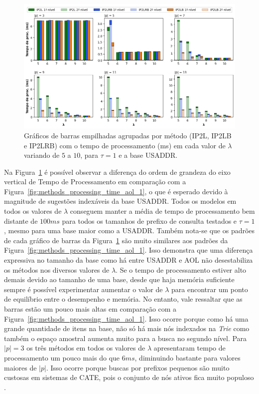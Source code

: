 \begin{figure} [h]
    \centering
    \includegraphics[width=1.0\textwidth]{figures/methods_processing_time_usaddr_1.png}
    \caption{Gráficos de barras empilhadas agrupadas por método (IP2L, IP2LB e IP2LRB) com o tempo de processamento (ms) em cada valor de $\lambda$ variando de $5$ a $10$, para $\tau=1$ e a base USADDR.}
    \label{fig:methods_processing_time_usaddr_1}
\end{figure}

Na Figura~\ref{fig:methods_processing_time_usaddr_1} é possível observar a diferença do ordem de grandeza do eixo vertical de Tempo de Processamento em comparação com a Figura~\ref{fig:methods_processing_time_aol_1}, o que é esperado devido à magnitude de sugestões indexáveis da base USADDR. Todos os modelos em todos os valores de $\lambda$ conseguem manter a média de tempo de processamento bem distante de $100ms$ para todos os tamanhos de prefixo de consulta testados e $\tau=1$, mesmo para uma base maior como a USADDR. Também nota-se que os padrões de cada gráfico de barras da Figura~\ref{fig:methods_processing_time_usaddr_1} são muito similares aos padrões da Figura~\ref{fig:methods_processing_time_aol_1}. Isso demonstra que uma diferença expressiva no tamanho da base como há entre USADDR e AOL não desestabiliza os métodos nos diversos valores de $\lambda$. Se o tempo de processamento estiver alto demais devido ao tamanho de uma base, desde que haja memória suficiente sempre é possível experimentar aumentar o valor de $\lambda$ para encontrar um ponto de equilíbrio entre o desempenho e memória. No entanto, vale ressaltar que as barras estão um pouco mais altas em comparação com a Figura~\ref{fig:methods_processing_time_aol_1}. Isso ocorre porque como há uma grande quantidade de itens na base, não só há mais nós indexados na \textit{Trie} como também o espaço amostral aumenta muito para a busca no segundo nível. Para $|p|=3$ os três métodos em todos os valores de $\lambda$ apresentaram tempo de processamento um pouco mais do que $6ms$, diminuindo bastante para valores maiores de $|p|$. Isso ocorre porque buscas por prefixos pequenos são muito custosas em sistemas de CATE, pois o conjunto de nós ativos fica muito populoso \citep{berg2020}.

